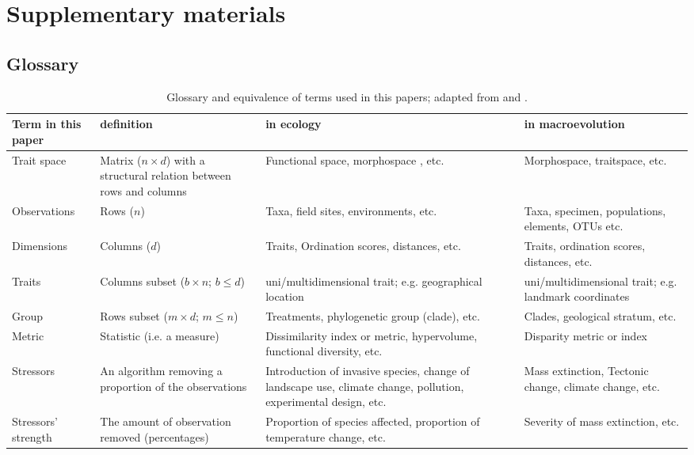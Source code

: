 \documentclass[12pt,letterpaper]{article}
\begin{document}
\section{Supplementary materials}

\subsection{Glossary}


\begin{table}[ht]
\caption{Glossary and equivalence of terms used in this papers; adapted from \cite{guillerme2018disprity} and \cite{mammola2021concepts}.}
\centering
\begin{tabular}{p{2.5cm}p{4cm}p{5cm}p{5cm}}
Term in this paper & definition & in ecology & in macroevolution \\
\hline
Trait space & Matrix ($n \times d$) with a structural relation between rows and columns & Functional space, morphospace , etc. & Morphospace, traitspace, etc.  \\
\hline
Observations & Rows ($n$) & Taxa, field sites, environments, etc. & Taxa, specimen, populations, elements, OTUs etc. \\
\hline
Dimensions & Columns ($d$) & Traits, Ordination scores, distances, etc. & Traits, ordination scores, distances, etc. \\
\hline
Traits & Columns subset ($b \times n$; $b \leq d$) & uni/multidimensional trait; e.g. geographical location & uni/multidimensional trait; e.g. landmark coordinates \\
\hline
Group & Rows subset ($m \times d$; $m \leq n$) & Treatments, phylogenetic group (clade), etc. & Clades, geological stratum, etc. \\
\hline
Metric & Statistic (i.e. a measure) & Dissimilarity index or metric, hypervolume, functional diversity, etc. & Disparity metric or index \\
\hline
Stressors & An algorithm removing a proportion of the observations & Introduction of invasive species, change of landscape use, climate change, pollution, experimental design, etc. & Mass extinction, Tectonic change, climate change, etc. \\
\hline
Stressors' strength & The amount of observation removed (percentages) & Proportion of species affected, proportion of temperature change, etc. & Severity of mass extinction,  etc. \\
\end{tabular}
\end{table}
\end{document}
